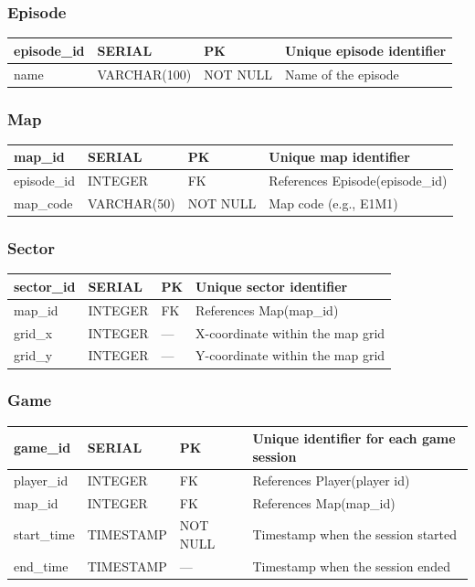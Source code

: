 \documentclass[11pt]{article}
\begin{document}
\subsubsection*{Episode}
\begin{tabularx}{\linewidth}{|l|l|l|X|}
\hline
episode\_id & SERIAL & PK & Unique episode identifier \\
\hline
name & VARCHAR(100) & NOT NULL & Name of the episode \\
\hline
\end{tabularx}

\subsubsection*{Map}
\begin{tabularx}{\linewidth}{|l|l|l|X|}
\hline
map\_id & SERIAL & PK & Unique map identifier \\
\hline
episode\_id & INTEGER & FK & References Episode(episode\_id) \\
\hline
map\_code & VARCHAR(50) & NOT NULL & Map code (e.g., E1M1) \\
\hline
\end{tabularx}

\subsubsection*{Sector}
\begin{tabularx}{\linewidth}{|l|l|l|X|}
\hline
sector\_id & SERIAL & PK & Unique sector identifier \\
\hline
map\_id & INTEGER & FK & References Map(map\_id) \\
\hline
grid\_x & INTEGER & --- & X-coordinate within the map grid \\
\hline
grid\_y & INTEGER & --- & Y-coordinate within the map grid \\
\hline
\end{tabularx}

\subsubsection*{Game}
\begin{tabularx}{\linewidth}{|l|l|l|X|}
\hline
game\_id & SERIAL & PK & Unique identifier for each game session \\
\hline
player\_id & INTEGER & FK & References Player(player id)\\
\hline
map\_id & INTEGER & FK & References Map(map\_id) \\
\hline
start\_time & TIMESTAMP & NOT NULL & Timestamp when the session started \\
\hline
end\_time & TIMESTAMP & --- & Timestamp when the session ended \\
\hline
\end{tabularx}
\end{document}
